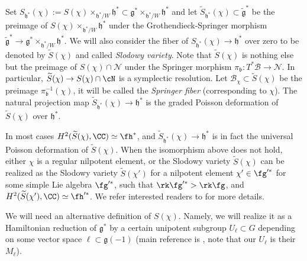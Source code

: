 \documentclass[12pt]{amsart}
\begin{document}
    Set $S_{\mathfrak{h}^*}(\chi) := S(\chi) \times_{\mathfrak{h}^*/W} \mathfrak{h}^* \subset \mathfrak{g}^* \times_{\mathfrak{h}^*/W} \mathfrak{h}^*$ and let $\widetilde{S}_{\mathfrak{h}^*}(\chi) \subset \widetilde{\mathfrak{g}}^*$ be the preimage of $S(\chi) \times_{\mathfrak{h}^*/W} \mathfrak{h}^*$ under the Grothendieck-Springer morphism $\widetilde{\mathfrak{g}}^* \rightarrow \mathfrak{g}^* \times_{\mathfrak{h}^*/W} \mathfrak{h}^*$. We will also consider the fiber of $S_{\mathfrak{h}^*}(\chi) \rightarrow \mathfrak{h}^*$ over zero to be denoted by $\widetilde{S}(\chi)$ and called {\emph{Slodowy variety}}. 
    Note that  $\widetilde{S}(\chi)$ is nothing else but the preimage of $S(\chi) \cap \mathcal{N}$ under the Springer morphism $\pi_{\mathfrak{b}}\colon T^*\mathcal{B} \rightarrow \mathcal{N}$. In particular, $\widetilde{S}(\chi)\to S(\chi)\cap \cN$ is a symplectic resolution. Let $\mathcal{B}_\chi \subset \widetilde{S}(\chi)$ be the preimage  $\pi_{\mathfrak{b}}^{-1}(\chi)$, it will be called the {\emph{Springer fiber}} (corresponding to $\chi$). The natural projection map $\widetilde{S}_{\mathfrak{h}^*}(\chi) \rightarrow \mathfrak{h}^*$ is the graded Poisson deformation of $\widetilde{S}(\chi)$ over $\mathfrak{h}^*$. 
   
\begin{rmk}\label{universal deformation of Slodowy slice}
    In most cases $H^2(\widetilde{S}(\chi), \CC)\simeq \fh^*$, and  $\widetilde{S}_{\mathfrak{h}^*}(\chi) \rightarrow \mathfrak{h}^*$ is in fact the universal Poisson deformation of $\widetilde{S}(\chi)$. When the isomorphism above does not hold, either $\chi$ is a regular nilpotent element, or the Slodowy variety $\widetilde{S}(\chi)$ can be realized as the Slodowy variety $\widetilde{S}(\chi')$ for a nilpotent element $\chi'\in \fg'^*$ for some simple Lie algebra $\fg'^*$, such that $\rk \fg'^* > \rk \fg$, and $H^2(\widetilde{S}(\chi'), \CC)\simeq \fh'^*$. We refer interested readers to \cite{LehnNamikawaSorger} for more details.
\end{rmk}
    
    
    
    
    We will need an alternative definition of $S(\chi)$. Namely, we will realize it as a Hamiltonian reduction of $\mathfrak{g}^*$ by a certain unipotent subgroup $U_\ell \subset G$ depending on some vector space $\ell \subset \mathfrak{g}(-1)$ (main reference is \cite{GanGinzburg}, note that our $U_\ell$ is their $M_\ell$).
\end{document}
